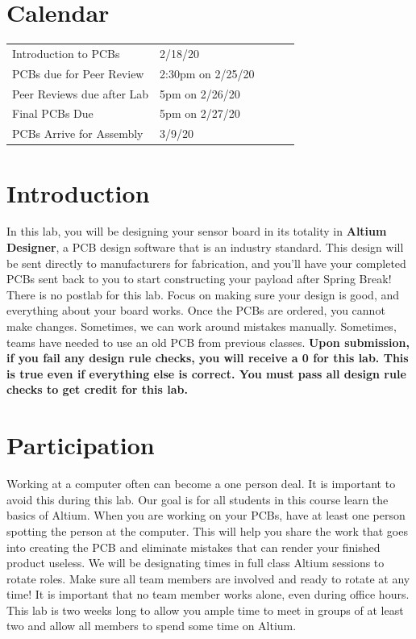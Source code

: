 \documentclass[12pt]{article}
\begin{document}
	\maketitle
	\thispagestyle{fancy}
	
    \section*{Calendar}
    \begin{table}[h]
        \begin{tabular}{lllll}
        Introduction to PCBs & 2/18/20  &  &  &  \\
        PCBs due for Peer Review         & 2:30pm on 2/25/20 &  &  &  \\
        Peer Reviews due after Lab     & 5pm on 2/26/20 &  &  &  \\
        Final PCBs Due    & 5pm on 2/27/20 &  &  &  \\
        PCBs Arrive for Assembly   & 3/9/20 &  &  &
        \end{tabular}
        \end{table}
    
	\section*{Introduction}
    In this lab, you will be designing your sensor board in its totality in \textbf{Altium Designer}, a PCB design software that is an industry standard. This design will be sent directly to manufacturers for fabrication, and you'll have your completed PCBs sent back to you to start constructing your payload after Spring Break! There is no postlab for this lab. Focus on making sure your design is good, and everything about your board works. Once the PCBs are ordered, you cannot make changes. Sometimes, we can work around mistakes manually. Sometimes, teams have needed to use an old PCB from previous classes. \textbf{Upon submission, if you fail any design rule checks, you will receive a 0 for this lab. This is true even if everything else is correct. You must pass all design rule checks to get credit for this lab.} 
    
    \section*{Participation}
    Working at a computer often can become a one person deal. It is important to avoid this during this lab. Our goal is for all students in this course learn the basics of Altium. When you are working on your PCBs, have at least one person spotting the person at the computer. This will help you share the work that goes into creating the PCB and eliminate mistakes that can render your finished product useless. We will be designating times in full class Altium sessions to rotate roles. Make sure all team members are involved and ready to rotate at any time! It is important that no team member works alone, even during office hours. This lab is two weeks long to allow you ample time to meet in groups of at least two and allow all members to spend some time on Altium.
    
\end{document}
